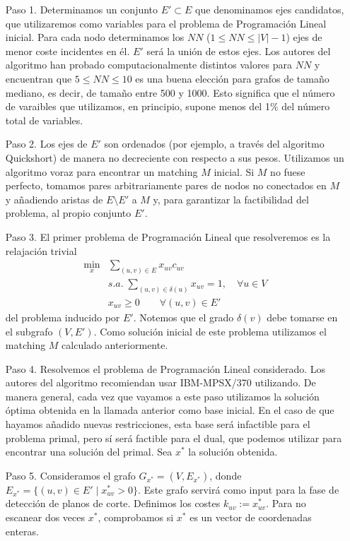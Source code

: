 \documentclass[twoside,a4paper,openright,12pt,tikz]{book}
\begin{document}
\begin{itemize}
\item[Paso 1.] Determinamos un conjunto $E'\subset E$ que denominamos ejes candidatos, que utilizaremos como variables para el problema de Programación Lineal inicial. Para cada nodo determinamos los $NN$ ($1\leq NN \leq |V|-1$) ejes de menor coste incidentes en él. $E'$ será la unión de estos ejes. Los autores del algoritmo han probado computacionalmente distintos valores para $NN$ y encuentran que $5\leq NN \leq 10$ es una buena elección para grafos de tamaño mediano, es decir, de tamaño entre 500 y 1000. Esto significa que el número de varaibles que utilizamos, en principio, supone menos del 1\% del número total de variables. 
\item[Paso 2.] Los ejes de $E'$ son ordenados (por ejemplo, a través del algoritmo Quickshort) de manera no decreciente con respecto a sus pesos. Utilizamos un algoritmo voraz para encontrar un matching $M$ inicial. Si $M$ no fuese perfecto, tomamos pares arbitrariamente pares de nodos no conectados en $M$ y añadiendo aristas de $E\setminus E'$ a $M$ y, para garantizar la factibilidad del problema, al propio conjunto $E'$. 
\item[Paso 3.] El primer problema de Programación Lineal que resolveremos es la relajación trivial 
\begin{align*}
\min_x & \sum_{(u,v) \in E}x_{uv}c_{uv}\\
&s.a.\;\sum_{(u,v)\in\delta(u)} x_{uv} = 1, \quad \forall u \in V\\
&x_{uv} \geq 0 \qquad \forall(u,v)\in E'
\end{align*}
del problema inducido por $E'$. Notemos que el grado $\delta(v)$ debe tomarse en el subgrafo $(V,E')$. Como solución inicial de este problema utilizamos el matching $M$ calculado anteriormente.
\newpage
\item[Paso 4.] Resolvemos el problema de Programación Lineal considerado. Los autores del algoritmo recomiendan usar IBM-MPSX/370 utilizando. De manera general, cada vez que vayamos a este paso utilizamos la solución óptima obtenida en la llamada anterior como base inicial. En el caso de que hayamos añadido nuevas restricciones, esta base será infactible para el problema primal, pero sí será factible para el dual, que podemos utilizar para encontrar una solución del primal. Sea $x^*$ la solución obtenida.
\item[Paso 5.] Consideramos el grafo $G_{x^*}=(V,E_{x^*})$, donde $E_{x^*} =\{(u,v)\in E'\mid x^*_{uv}>0\}$. Este grafo servirá como input para la fase de detección de planos de corte. Definimos los costes $k_{uv}:=x^*_{uv}$. Para no escanear dos veces $x^*$, comprobamos si $x^*$ es un vector de coordenadas enteras.

\end{itemize}
\end{document}
